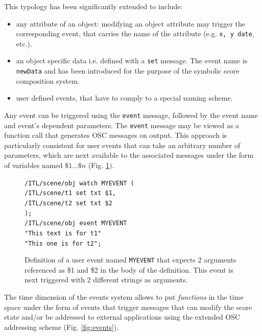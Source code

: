 \documentclass[11pt,a4paper]{article}
\newcommand{\OSC}[1]	{{\fontsize{10pt}{10pt} \selectfont\texttt{#1}}}
\newcommand{\tab}		{\hspace*{4mm}}
\newcommand{\sample}[1]	{\vspace{-0.2em}\begin{center}\colorbox{mygrey}{\begin{minipage}[t]{0.98\columnwidth} {\small \texttt{#1}}\end{minipage}}\end{center}}
\begin{document}
This typology has been significantly extended to include:
\begin{itemize}
\item any attribute of an object: modifying an object attribute may trigger the corresponding event, that carries the name of the attribute (e.g. \OSC{x, y date}, etc.). 
\item an object specific data i.e. defined with a \OSC{set} message. The event name is \OSC{newData} and has been introduced for the purpose of the symbolic score composition system.
\item user defined events, that have to comply to a special naming scheme.
\end{itemize}
\vspace*{1mm}
Any event can be triggered using the \OSC{event} message, followed by the event name and event's dependent parameters. The \OSC{event} message may be viewed as a function call that generates OSC messages on output. This approach is particularly consistent for user events that can take an arbitrary number of parameters, which are next available to the associated messages under the form of variables named  $\$1...\$n$ (Fig. \ref{fig:uevent}).


\begin{figure}[h]
   \centering
   \sample{/ITL/scene/obj watch MYEVENT ( \\
\tab/ITL/scene/t1 set txt \$1, \\
\tab/ITL/scene/t2 set txt \$2 \\
);   \\   
/ITL/scene/obj event MYEVENT \\
\hspace*{25mm}"This text is for t1"\\
\hspace*{25mm}"This one is for t2"; 
}
   \caption{Definition of a user event named \OSC{MYEVENT} that expects 2 arguments referenced as \$1 and \$2 in the body of the definition. This event is next triggered with 2 different strings as arguments.}
   \label{fig:uevent}
\end{figure}

The time dimension of the events system allows to put \emph{functions} in the time space under the form of events that trigger messages that can modify the score state and/or be addressed to external applications using the extended OSC addressing scheme (Fig. \ref{fig:events}).
  
\end{document}
